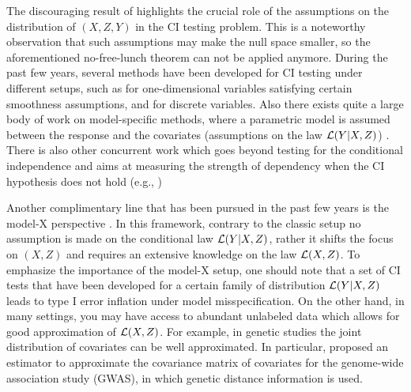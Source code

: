 \documentclass[11pt]{article}
\newcommand{\aj}[1]{\noindent{\textcolor{blue}{\textsf{#1} \#\#\#}}}
\begin{document}
The discouraging result of \cite{shah2020hardness} highlights the crucial role of the assumptions on the distribution of $(X,Z,Y)$ in the CI testing problem. This is a noteworthy observation that such assumptions may make the null space smaller, so the aforementioned no-free-lunch theorem can not be applied anymore. 
During the past few years, several methods have been developed for CI testing under different setups, such as  \cite{neykov2020minimax} for one-dimensional variables satisfying certain smoothness assumptions, and \cite{canonne2018testing} for discrete variables. Also there exists  quite a large body of work on model-specific methods, where a parametric model is assumed between the response and the covariates (assumptions on the law $\mathcal{L}(Y|X,Z)$) \cite{liang2018bayesian, crawford2018bayesian, belloni2014inference}. There is also other concurrent work which goes beyond  testing for the conditional independence and aims at measuring the strength of dependency when the CI hypothesis does not hold (e.g.,  \cite{zhang2020floodgate, azadkia2019simple})



Another complimentary line that has been pursued in the past few years is the model-X perspective \cite{candes2018panning}.  In this framework, contrary to the classic setup no assumption is made on the conditional law $\mathcal{L}({Y|X,Z})$, rather it shifts the focus on $(X,Z)$ and requires an extensive knowledge on the law $\mathcal{L}({X,Z})$. To emphasize the importance of the model-X setup, one should note that a set of CI tests that have been developed for a certain family of distribution $\mathcal{L}({Y|X,Z})$ leads to type I error inflation under model misspecification. On the other hand, in many settings, you may have access to abundant unlabeled data which allows for good approximation of $\mathcal{L}({X,Z})$. For example, in genetic studies \cite{peters2016comprehensive, cong2013multiplex} the joint distribution of covariates can be well approximated. In particular, \cite{wen2010using} proposed an estimator to approximate the covariance matrix of covariates for the genome-wide association study (GWAS), in which genetic distance information is used.
\end{document}
